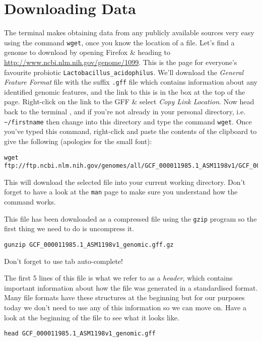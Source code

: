 \section{Downloading Data}

\begin{steps}
The terminal makes obtaining data from any publicly available sources very easy using the command \texttt{wget}, once you know the location of a file.
Let's find a genome to download by opening Firefox \& heading to \url{http://www.ncbi.nlm.nih.gov/genome/1099}.
This is the page for everyone's favourite probiotic \texttt{Lactobacillus\_acidophilus}.
We'll download the \textit{General Feature Format} file with the suffix \texttt{.gff} file which contains information about any identified genomic features, and the link to this is in the box at the top of the page.
Right-click on the link to the GFF \& select \textit{Copy Link Location}.
Now head back to the terminal , and if you're not already in your personal directory, i.e. \texttt{\~{}/firstname} then change into this directory and type the command \texttt{wget}.
Once you've typed this command, right-click and paste the contents of the clipboard to give the following (apologies for the small font):
\end{steps}

\begin{lstlisting}[basicstyle=\tiny]
wget ftp://ftp.ncbi.nlm.nih.gov/genomes/all/GCF_000011985.1_ASM1198v1/GCF_000011985.1_ASM1198v1_genomic.gff.gz
\end{lstlisting}

This will download the selected file into your current working directory.
Don't forget to have a look at the \texttt{man} page to make sure you understand how the command works.

\begin{steps}
This file has been downloaded as a compressed file using the \texttt{gzip} program so the first thing we need to do is uncompress it.
\begin{lstlisting}
gunzip GCF_000011985.1_ASM1198v1_genomic.gff.gz
\end{lstlisting}
Don't forget to use tab auto-complete!
\end{steps}


\begin{steps}
The first 5 lines of this file is what we refer to as a \textit{header}, which contains important information about how the file was generated in a standardised format.
Many file formats have these structures at the beginning but for our purposes today we don't need to use any of this information so we can move on.
Have a look at the beginning of the file to see what it looks like.
\end{steps}
\begin{lstlisting}
head GCF_000011985.1_ASM1198v1_genomic.gff
\end{lstlisting}

